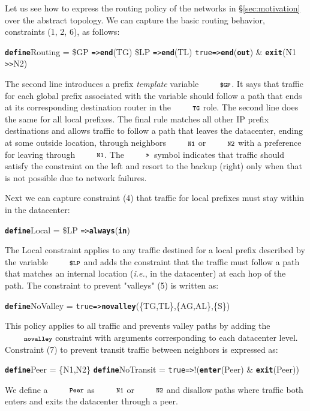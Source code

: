 \documentclass[numbers, 10pt, preprint]{sigplanconf}
\newcommand{\IE}{\emph{i.e.}}
\newcommand{\CD}[1]{\texttt{\small #1}}  %
\newcommand{\KW}[1]{\texttt{\small\bfseries{#1}}}
\newcommand{\True}{\CD{true}}
\newcommand{\Define}{\KW{define}}
\newcommand{\Prefer}{\texttt{>>}}
\newcommand{\Path}{\texttt{=>}}
\newcommand{\In}{\KW{in}}
\newcommand{\Out}{\KW{out}}
\newcommand{\Exit}{\KW{exit}}
\newcommand{\End}{\KW{end}}
\newcommand{\Enter}{\KW{enter}}
\newcommand{\Always}{\KW{always}}
\newcommand{\Novalley}{\KW{novalley}}
\begin{document}
Let us see how to express the routing policy of the networks in \S\ref{sec:motivation} over the abstract topology. We can capture the basic routing behavior, constraints (1, 2, 6),  as follows:
%
\begin{code}
\Define Routing =
    \$GP  \Path \End(TG)
    \$LP  \Path \End(TL)
    \True \Path \End(\Out) & \Exit(N1 \Prefer N2)
\end{code}
\noindent%

The second line introduces a prefix \emph{template} variable $\CD{\$GP}$. It says that traffic for each global prefix associated with the variable should follow a path that ends at its corresponding destination router in the $\CD{TG}$ role. The second line does the same for all local prefixes.
%
The final rule matches all other IP prefix destinations and allows traffic to follow a path that leaves the datacenter, ending at some outside location, through neighbors $\CD{N1}$ or $\CD{N2}$ with a preference for leaving through $\CD{N1}$. The $\CD{\Prefer}$~symbol indicates that traffic should satisfy the constraint on the left and resort to the backup (right) only when that is not possible due to network failures.%

Next we can capture constraint (4) that traffic for local prefixes must stay within in the datacenter:
%
\begin{code}
\Define Local =
    \$LP \Path \Always(\In)
\end{code}
\noindent%
%
The Local constraint applies to any traffic destined for a local prefix described by the variable $\CD{\$LP}$ and adds the constraint that the traffic must follow a path that matches an internal location (\IE, in the datacenter) at each hop of the path.
%
The constraint to prevent "valleys" (5) is written as:
%
\begin{code}
\Define NoValley =
    \True \Path \Novalley(\{TG,TL\},\{AG,AL\},\{S\})
\end{code}
\noindent%
%
This policy applies to all traffic and prevents valley paths by adding the $\Novalley$ constraint with arguments corresponding to each datacenter level.
%
Constraint (7) to prevent transit traffic between neighbors is expressed as:
%
\begin{code}
\Define Peer = \{N1,N2\}
\Define NoTransit =
    \True \Path !(\Enter(Peer) & \Exit(Peer))
\end{code}
\noindent%
%
We define a $\CD{Peer}$ as $\CD{N1}$ or $\CD{N2}$ and disallow paths where traffic both enters and exits the datacenter through a peer.
\end{document}
